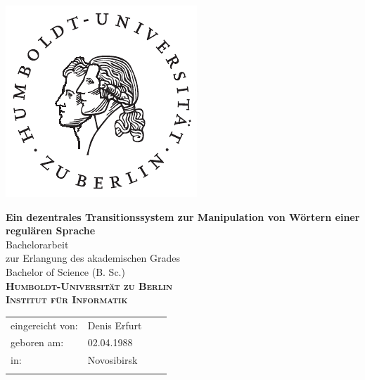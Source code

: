 \begin{titlepage}
\hspace{0cm}
\vspace{-2cm}
 
\begin{flushright}
\includegraphics[width=3.2 cm]{bilder/husiegel.pdf}
\end{flushright}
 
 
\begin{center}
  \vspace{0.5 cm}
  \LARGE{\bf Ein dezentrales Transitionssystem zur Manipulation von Wörtern einer regulären Sprache} \\ %
  \vspace{1 cm}
  \LARGE  Bachelorarbeit \\ %
  \vspace{1cm}
  \Large zur Erlangung des akademischen Grades \\
  Bachelor of Science (B. Sc.) \\ %
  \vspace{1.0cm}
  {\large
    \bf{
      \scshape
      Humboldt-Universit\"at zu Berlin \\
      Institut f\"ur Informatik\\
    }
  } 
\end{center}
\vspace{1.0 cm}
{\large
  \begin{tabular}{llll}
    eingereicht von:    & Denis Erfurt && \\ %
    geboren am:         & 02.04.1988 && \\
    in:                 & Novosibirsk && \\
    &&&\\

\end{tabular}}
\end{titlepage}
